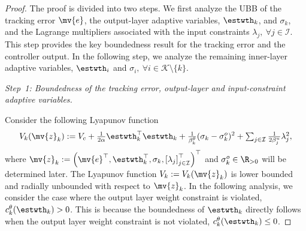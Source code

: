 \documentclass[letterpaper, journal]{IEEEtran}
\begin{document}
\begin{proof}

The proof is divided into two steps.
We first analyze the UBB of the tracking error $\mv{e}$, the output-layer adaptive variables, $\estwth_k$, and $\sigma_k$, and the Lagrange multipliers associated with the input constraints $\lambda_j,\ \forall j\in\mathcal{I}$.
This step provides the key boundedness result for the tracking error and the controller output.
In the following step, we analyze the remaining inner-layer adaptive variables, $\estwth_i$ and $\sigma_i,\ \forall i\in\mathcal{K}\setminus\{k\}$.

\hfill

\textit{Step~1: Boundedness of the tracking error, output-layer and input-constraint adaptive variables.}

Consider the following Lyapunov function 
\begin{equation} \label{eq:Vk:def}
  V_{k}(\mv{z}_k)
  :=
  V_c
  +
  \tfrac{1}{2\alpha}\estwth_k^\top\estwth_k
  +
  \tfrac{1}{\beta_k^\theta}(\sigma_k-\sigma_k^o)^2
  +
  \textstyle\sum_{j\in\mathcal{I}}
  \tfrac{1}{2\beta_j^{u}}\lambda_j^2
  ,
\end{equation}
where 
$
  \mv{z}_k
  :=
  \left(
    \mv{e}^\top,
    \estwth_k^\top,
    \sigma_k,
    \left[
      \lambda_j
    \right]_{j\in\mathcal{I}}^\top
  \right)^\top
$ and $\sigma_k^o\in\R_{>0}$ will be determined later.
The Lyapunov function $V_k:=V_k(\mv{z}_k)$ is lower bounded and radially unbounded with respect to $\mv{z}_k$.
In the following analysis, we consider the case where the output layer weight constraint is violated, \ie $c_k^{\theta}(\estwth_k)>0$.
This is because the boundedness of $\estwth_k$ directly follows when the output layer weight constraint is not violated, \ie $c_k^{\theta}(\estwth_k)\le0$.


\end{proof}
\end{document}
